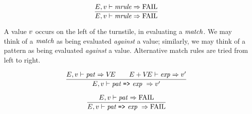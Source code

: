 \begin{equation}	%
\frac{\E,\V\ts\mrule\ra\FAIL}
     {\E,\V\ts\mrule\ra\FAIL}
\end{equation}

\comment A value $v$ occurs on the left of the turnstile, in evaluating
a ${\it match}$. We may think of a ${\it match}$ as being evaluated {\sl against}
a value; similarly, we may think of a pattern as being evaluated {\sl
against} a value.
Alternative match rules are tried from left to right.

\begin{equation}	%
\frac{\E,\V\ts\pat\ra\VE\qquad\E+\VE\ts\exp\ra\V'}
     {\E,\V\ts\longmrule\ \ra\V'}\index{54.2}
\end{equation}

\begin{equation}	%
\frac{\E,\V\ts\pat\ra\FAIL}
     {\E,\V\ts\longmrule\ \ra\FAIL}
\end{equation}

%
%

\insertion{\thedatatyperepl}{\begin{equation}
\frac{\ts\typbind\ra\TE}
     {\E\ts\typedec\ra\TE\ \In\ \Env}
\end{equation}}

\insertion{\thedatatyperepl}{
\begin{equation}
\frac{\ts\datbind\ra\VE,\TE}
     {\E\ts\datatypedec\ra(\VE,\TE)\ \In\ \Env}
\end{equation}}

